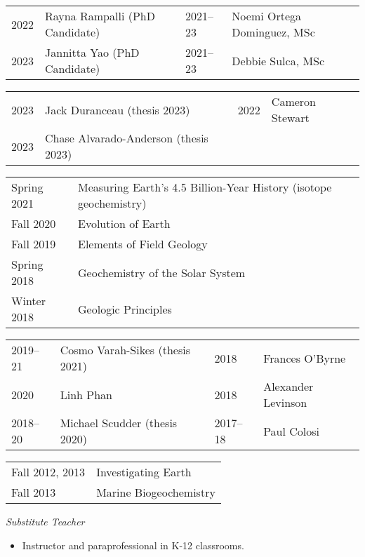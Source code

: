 \begin{tabular}{ll|ll}
	2022\ongoing & Rayna Rampalli (PhD Candidate) 
	&
	2021--23 & Noemi Ortega Dominguez, MSc
	\\
	2023\ongoing & Jannitta Yao (PhD Candidate)
	&
	2021--23 & Debbie Sulca, MSc
\end{tabular}
\begin{tabular}{ll | ll}
	2023 & Jack Duranceau (thesis 2023) & 2022 & Cameron Stewart\\
	2023 & Chase Alvarado-Anderson (thesis 2023)\\
\end{tabular}

\begin{tabular}{p{.15\linewidth} l}
	Spring 2021 & Measuring Earth’s 4.5 Billion-Year History \normalfont(isotope geochemistry)\\
	Fall 2020 & Evolution of Earth\\
	Fall 2019 & Elements of Field Geology\\
	Spring 2018 & Geochemistry of the Solar System\\
	Winter 2018 & Geologic Principles
\end{tabular}

\begin{tabular}{ll | ll}
	2019--21 & Cosmo Varah-Sikes (thesis 2021) &
	2018 & Frances O'Byrne\\
	2020 & Linh Phan &
	2018 & Alexander Levinson \\
	2018--20 & Michael Scudder (thesis 2020) &
	2017--18 & Paul Colosi
\end{tabular}

\begin{tabular}{p{.15\linewidth} l} %
Fall 2012, 2013 & Investigating Earth\\Fall 2013 & Marine Biogeochemistry
\end{tabular}

\textit{Substitute Teacher}
\begin{itemize}
	\item Instructor and paraprofessional in K-12 classrooms.
\end{itemize}
